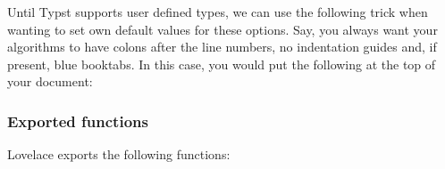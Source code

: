 Until Typst supports user defined types, we can use the following trick
when wanting to set own default values for these options. Say, you
always want your algorithms to have colons after the line numbers, no
indentation guides and, if present, blue booktabs. In this case, you
would put the following at the top of your document:

\begin{Shaded}
\begin{Highlighting}[]
\NormalTok{)}

\end{Highlighting}
\end{Shaded}

\subsubsection{Exported functions}\label{exported-functions}

Lovelace exports the following functions:

